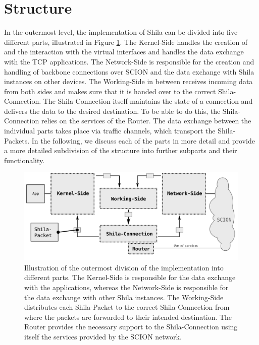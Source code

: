 \newpage
\section{Structure}
\label{sec:ImplementationStructure}

In the outermost level, the implementation of Shila can be divided into five different parts, illustrated in Figure \ref{fig:ImplementationModulesOutermost}. The Kernel-Side handles the creation of and the interaction with the virtual interfaces and handles the data exchange with the TCP applications. The Network-Side is responsible for the creation and handling of backbone connections over SCION and the data exchange with Shila instances on other devices. The Working-Side in between receives incoming data from both sides and makes sure that it is handed over to the correct Shila-Connection. The Shila-Connection itself maintains the state of a connection and delivers the data to the desired destination. To be able to do this, the Shila-Connection relies on the services of the Router.  The data exchange between the individual parts takes place via traffic channels, which transport the Shila-Packets. In the following, we discuss each of the parts in more detail and provide a more detailed subdivision of the structure into further subparts and their functionality.  

\begin{figure}[H]
	\begin{center}
		\def\svgwidth{1\textwidth}
		\includegraphics[scale=0.2]{../illustrations/implementation/ModulesOutermost.pdf}   
		\caption[]{Illustration of the outermost division of the implementation into different parts. The Kernel-Side is responsible for the data exchange with the applications, whereas the Network-Side is responsible for the data exchange with other Shila instances. The Working-Side distributes each Shila-Packet to the correct Shila-Connection from where the packets are forwarded to their intended destination. The Router provides the necessary support to the Shila-Connection using itself the services provided by the SCION network.}
		\label{fig:ImplementationModulesOutermost}
	\end{center}
\end{figure}

